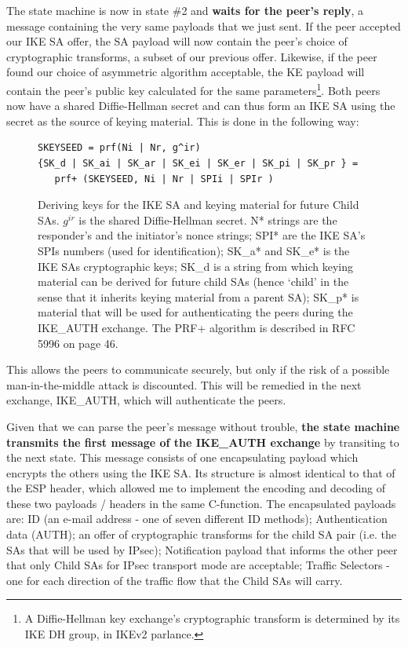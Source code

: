 \documentclass[final,a4paper,twoside,11pt,onecolumn]{report}
\begin{document}
The state machine is now in state \#2 and \textbf{waits for the peer's reply}, a message containing the very same payloads that we just sent. If the peer accepted our IKE SA offer, the SA payload will now contain the peer's choice of cryptographic transforms, a subset of our previous offer. Likewise, if the peer found our choice of asymmetric algorithm acceptable, the KE payload will contain the peer's public key calculated for the same parameters\footnote{A Diffie-Hellman key exchange's cryptographic transform is determined by its IKE DH group, in IKEv2 parlance.}. Both peers now have a shared Diffie-Hellman secret and can thus form an IKE SA using the secret as the source of keying material. This is done in the following way:

\begin{figure}[h]
   \begin{verbatim}
SKEYSEED = prf(Ni | Nr, g^ir) 
{SK_d | SK_ai | SK_ar | SK_ei | SK_er | SK_pi | SK_pr } =
   prf+ (SKEYSEED, Ni | Nr | SPIi | SPIr )
   \end{verbatim}
   \caption{Deriving keys for the IKE SA and keying material for future Child SAs. $g^{ir}$ is the shared Diffie-Hellman secret. N* strings are the responder's and the initiator's nonce strings; SPI* are the IKE SA's SPIs numbers (used for identification); SK\_a* and SK\_e* is the IKE SAs cryptographic keys; SK\_d is a string from which keying material can be derived for future child SAs (hence `child' in the sense that it inherits keying material from a parent SA); SK\_p* is material that will be used for authenticating the peers during the IKE\_AUTH exchange. The PRF+ algorithm is described in RFC 5996 on page 46.}
\end{figure}

This allows the peers to communicate securely, but only if the risk of a possible man-in-the-middle attack is discounted. This will be remedied in the next exchange, IKE\_AUTH, which will authenticate the peers.

Given that we can parse the peer's message without trouble, \textbf{the state machine transmits the first message of the IKE\_AUTH exchange} by transiting to the next state. This message consists of one encapsulating payload which encrypts the others using the IKE SA. Its structure is almost identical to that of the ESP header, which allowed me to implement the encoding and decoding of these two payloads / headers in the same C-function. The encapsulated payloads are: ID (an e-mail address - one of seven different ID methods); Authentication data (AUTH); an offer of cryptographic transforms for the child SA pair (i.e. the SAs that will be used by IPsec); Notification payload that informs the other peer that only Child SAs for IPsec transport mode are acceptable; Traffic Selectors - one for each direction of the traffic flow that the Child SAs will carry.
\end{document}
